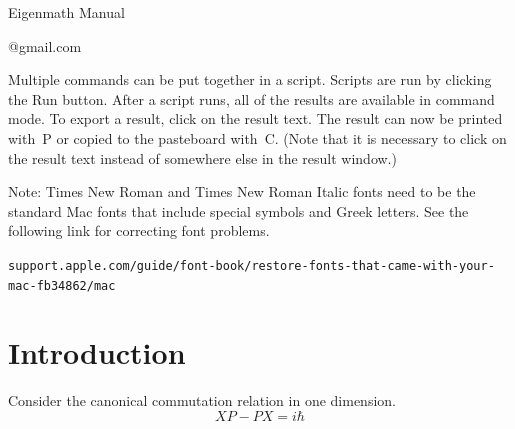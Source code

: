 \documentclass[12pt]{article}
\begin{document}
\newpage
\begin{center}
{\LARGE Eigenmath Manual}

@gmail.com
\end{center}

\begin{center}
\end{center}

Multiple commands can be put together in a script.
Scripts are run by clicking the Run button.
After a script runs, all of the results are available in command mode.
To export a result, click on the result text.
The result can now be printed with \cmd$\,$P or copied to the pasteboard with \cmd$\,$C.
(Note that it is necessary to click on the result text
instead of somewhere else in the result window.)

\bigskip
Note: Times New Roman and Times New Roman Italic fonts need
to be the standard Mac fonts that include special symbols and Greek letters.
See the following link for correcting font problems.

\bigskip
{\footnotesize\verb$support.apple.com/guide/font-book/restore-fonts-that-came-with-your-mac-fb34862/mac$}

\newpage
\tableofcontents

\newpage

\section{Introduction}

Consider the canonical commutation relation in one dimension.
\begin{equation*}
XP-PX=i\hbar
\end{equation*}
\end{document}
